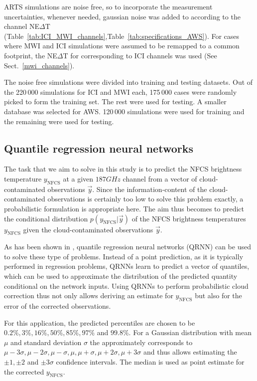 \documentclass[amt, manuscript]{copernicus}
\newcommand{\ynfcs}{y_\text{NFCS}}
\newcommand{\y}{\vec{y}}
\begin{document}
ARTS simulations are noise free, so to incorporate the measurement uncertainties, whenever needed, gaussian noise was added to according to the channel NE$\Delta$T (Table~\ref{tab:ICI_MWI_channels},Table~\ref{tab:specifications_AWS}). For cases where MWI and ICI simulations were assumed to be remapped to a common footprint, the NE$\Delta$T for corresponding to ICI channels was used (See Sect.~\ref{mwi_channels}).

The noise free simulations were divided into training and testing datasets. Out of the 220\,000 simulations for ICI and MWI each, 175\,000 cases were randomly picked to form the training set. The rest were used for testing. A smaller database was selected for AWS. 120\,000 simulations were used for training and the remaining were used for testing.

\subsection{Quantile regression neural networks}
%
The task that we aim to solve in this study is to predict the NFCS brightness
temperature $\ynfcs$ at a given $187\unit{GHz}$ channel from a vector of
cloud-contaminated observations $\y$. Since the information-content of the
cloud-contaminated observations is certainly too low to solve this problem
exactly, a probabilistic formulation is appropriate here. The aim thus becomes
to predict the conditional distribution $p(\ynfcs | \y)$ of the NFCS brightness
temperatures $\ynfcs$ given the cloud-contaminated observations $\y$.

As has been shown in \citet{pfreundschuh:aneur:18}, quantile regression neural
networks (QRNN) can be used to solve these type of problems. Instead of a point
prediction, as it is typically performed in regression problems, QRNNs learn to
predict a vector of quantiles, which can be used to approximate the distribution
of the predicted quantity conditional on the network inputs. Using QRNNs to
perform probabilistic cloud correction thus not only allows deriving an estimate
for $\ynfcs$ but also for the error of the corrected observations.

For this application, the predicted percentiles are chosen to be
$0.2\%, 3\%, 16\%, 50\%, 85\%, 97\%$ and $99.8\%$. For a Gaussian
distribution with mean $\mu$ and standard deviation $\sigma$ the
approximately corresponds to $\mu -3\sigma, \mu-2\sigma, \mu-\sigma
, \mu, \mu + \sigma, \mu + 2\sigma, \mu + 3\sigma$ and thus allows
estimating the $\pm 1, \pm 2$ and $\pm 3\sigma$ confidence intervals.
The median is used as point estimate for the corrected $\ynfcs$.
\end{document}
